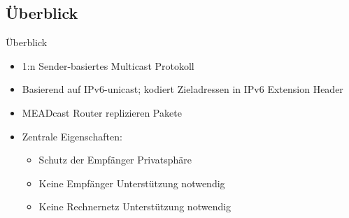 \documentclass[compress,fleqn,utf8,aspectratio=169,t]{beamer}
\begin{document}
\subsection{Überblick} %
\label{sub:Overview}
\begin{frame}{Überblick}
	\begin{itemize}
        \item 1:n Sender-basiertes Multicast Protokoll \cite{meadcast1, meadcast2}
        \item Basierend auf IPv6-unicast; kodiert Zieladressen in IPv6 Extension Header
		\item MEADcast Router replizieren Pakete
		\item Zentrale Eigenschaften:
		      \begin{itemize}
			      \item Schutz der Empfänger Privatsphäre 
			      \item Keine Empfänger Unterstützung notwendig
			      \item Keine Rechnernetz Unterstützung notwendig
		      \end{itemize}
	\end{itemize}
\end{frame}
\end{document}

